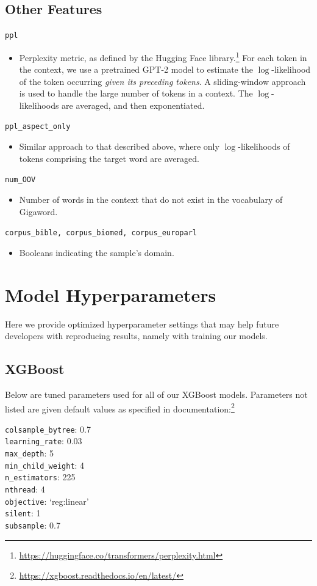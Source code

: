 \documentclass[11pt,a4paper]{article}
\begin{document}
\subsection{Other Features}

\texttt{ppl}
\begin{itemize}
  \item Perplexity metric, as defined by the Hugging Face library.\footnote{\url{https://huggingface.co/transformers/perplexity.html}} For each token in the context, we use a pretrained GPT-2 model to estimate the $\log$-likelihood of the token occurring \textit{given its preceding tokens}. A sliding-window approach is used to handle the large number of tokens in a context. The $\log$-likelihoods are averaged, and then exponentiated.
\end{itemize}
\texttt{ppl\_aspect\_only}
\begin{itemize}
  \item Similar approach to that described above, where only $\log$-likelihoods of tokens comprising the target word are averaged.
\end{itemize}
\texttt{num\_OOV}
\begin{itemize}
  \item Number of words in the context that do not exist in the vocabulary of Gigaword.
\end{itemize}
\texttt{corpus\_bible, corpus\_biomed, corpus\_europarl}
\begin{itemize}
  \item Booleans indicating the sample's domain.
\end{itemize}

\section{Model Hyperparameters}

Here we provide optimized hyperparameter settings that may help future developers with reproducing results, namely with training our models.

\subsection{XGBoost}

Below are tuned parameters used for all of our XGBoost models. Parameters not listed are given default values as specified in documentation:\footnote{\url{https://xgboost.readthedocs.io/en/latest/}}

\indent \texttt{colsample\_bytree}: 0.7\\
\indent \texttt{learning\_rate}: 0.03\\
\indent \texttt{max\_depth}: 5\\
\indent \texttt{min\_child\_weight}: 4\\
\indent \texttt{n\_estimators}: 225\\
\indent \texttt{nthread}: 4\\
\indent \texttt{objective}: `reg:linear'\\
\indent \texttt{silent}: 1\\
\indent \texttt{subsample}: 0.7
\end{document}

